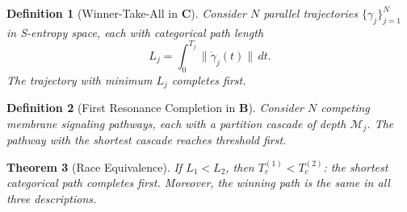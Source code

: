 \documentclass[twocolumn,10pt]{article}
\newtheorem{theorem}{Theorem}[section]
\newtheorem{definition}[theorem]{Definition}
\theoremstyle{remark}
\newcommand{\Depth}{\mathcal{M}}
\newcommand{\CatC}{\mathbf{C}}
\newcommand{\CatB}{\mathbf{B}}
\begin{document}
\begin{definition}[Winner-Take-All in $\CatC$]
\label{def:race_C}
Consider $N$ parallel trajectories $\{\gamma_j\}_{j=1}^N$ in S-entropy space, each with categorical path length
\begin{equation}
L_j = \int_0^{T_j} \|\dot{\gamma}_j(t)\|\,dt.
\label{eq:path_length}
\end{equation}
The trajectory with minimum $L_j$ completes first.
\end{definition}

\begin{definition}[First Resonance Completion in $\CatB$]
\label{def:race_B}
Consider $N$ competing membrane signaling pathways, each with a partition cascade of depth $\Depth_j$.
The pathway with the shortest cascade reaches threshold first.
\end{definition}

\begin{theorem}[Race Equivalence]
\label{thm:race_equiv}
If $L_1 < L_2$, then $T_c^{(1)} < T_c^{(2)}$: the shortest categorical path completes first.
Moreover, the winning path is the same in all three descriptions.
\end{theorem}
\end{document}
